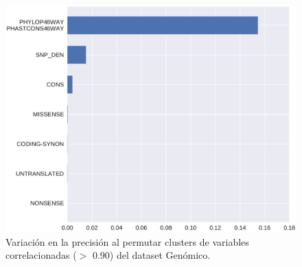 \begin{figure}[H]
    \centering
    \includegraphics[scale=0.6]{documents/latex/figures/3/genomic/genomic_importance_cluster.pdf}
    \caption{Variación en la precisión al permutar clusters de variables correlacionadas ($>$ 0.90) del dataset Genómico.}
    \label{fig:importance_genomic_cluster}
\end{figure}


\newpage

